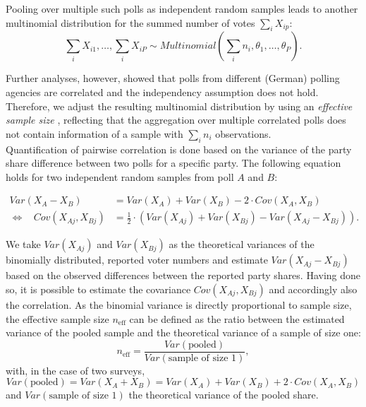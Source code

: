 \documentclass[smallcondensed]{svjour3}     %
\begin{document}

Pooling over multiple such polls as independent random samples leads to another
multinomial distribution for the summed number of votes $\sum_i X_{ip}$:
\begin{equation}
\sum\limits_i X_{i1},\ldots, \sum\limits_i X_{iP}
  \sim Multinomial \left( \sum\limits_i n_i,\theta_1,\ldots,\theta_P\right).
\end{equation}

Further analyses, however, showed that polls from different (German) polling agencies are correlated
and the independency assumption does not hold. Therefore, we adjust the resulting multinomial
distribution by using an \textit{effective sample size} \citep{hanley_2003}, reflecting that the aggregation over multiple correlated polls does not contain information of a sample with $\sum_i n_i$ observations.\\

Quantification of pairwise correlation is done based on the variance of the party share difference between two polls for a specific party. The following equation holds for two independent
random samples from poll $A$ and $B$:

\begin{equation}
\begin{aligned}
Var(X_A - X_B) &= Var(X_A) + Var(X_B) - 2 \cdot Cov(X_A, X_B) \\
\Leftrightarrow \ \ \ \ Cov(X_{Aj}, X_{Bj}) &= \frac{1}{2} \cdot \left(Var(X_{Aj}) + Var(X_{Bj}) - Var(X_{Aj} - X_{Bj}) \right).
\end{aligned}
\end{equation}

We take $Var(X_{Aj})$ and $Var(X_{Bj})$ as the theoretical variances of the binomially distributed, reported voter numbers and estimate $Var(X_{Aj} - X_{Bj})$ based on the observed differences between the reported party shares. Having done so, it is possible to estimate the covariance $Cov(X_{Aj}, X_{Bj})$ and accordingly also the correlation. As the binomial variance is directly proportional to sample size, the effective sample size $n_{\text{eff}}$ can be defined as the ratio between the estimated variance of the pooled sample and the theoretical variance of a sample of size one:
$$
n_{\text{eff}} = \frac{Var(\text{pooled})}{Var(\text{sample of size 1})},
$$
with, in the case of two surveys,
$$
Var(\text{pooled}) = Var(X_A + X_B) = Var(X_A) + Var(X_B) + 2 \cdot Cov(X_A,X_B)
$$
and $Var(\text{sample of size 1})$ the theoretical variance of the pooled share.
\end{document}
